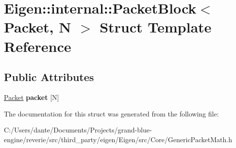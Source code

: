 \hypertarget{struct_eigen_1_1internal_1_1_packet_block}{}\section{Eigen\+::internal\+::Packet\+Block$<$ Packet, N $>$ Struct Template Reference}
\label{struct_eigen_1_1internal_1_1_packet_block}
\subsection*{Public Attributes}
\begin{DoxyCompactItemize}
\item 
\mbox{\label{struct_eigen_1_1internal_1_1_packet_block_a4e3862f63f99dc8eb22bb6ba284d05f5}} 
\mbox{\hyperlink{union_eigen_1_1internal_1_1_packet}{Packet}} {\bfseries packet} \mbox{[}N\mbox{]}
\end{DoxyCompactItemize}


The documentation for this struct was generated from the following file\+:\begin{DoxyCompactItemize}
\item 
C\+:/\+Users/dante/\+Documents/\+Projects/grand-\/blue-\/engine/reverie/src/third\+\_\+party/eigen/\+Eigen/src/\+Core/Generic\+Packet\+Math.\+h\end{DoxyCompactItemize}
